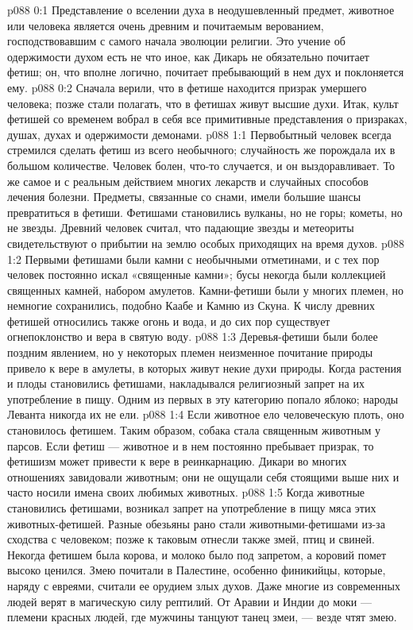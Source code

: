 \author{Блестящая Вечерняя Звезда}
\vs p088 0:1 Представление о вселении духа в неодушевленный предмет, животное или человека является очень древним и почитаемым верованием, господствовавшим с самого начала эволюции религии. Это учение об одержимости духом есть не что иное, как  Дикарь не обязательно почитает фетиш; он, что вполне логично, почитает пребывающий в нем дух и поклоняется ему.
\vs p088 0:2 Сначала верили, что в фетише находится призрак умершего человека; позже стали полагать, что в фетишах живут высшие духи. Итак, культ фетишей со временем вобрал в себя все примитивные представления о призраках, душах, духах и одержимости демонами.
\vs p088 1:1 Первобытный человек всегда стремился сделать фетиш из всего необычного; случайность же порождала их в большом количестве. Человек болен, что\hyp{}то случается, и он выздоравливает. То же самое и с реальным действием многих лекарств и случайных способов лечения болезни. Предметы, связанные со снами, имели большие шансы превратиться в фетиши. Фетишами становились вулканы, но не горы; кометы, но не звезды. Древний человек считал, что падающие звезды и метеориты свидетельствуют о прибытии на землю особых приходящих на время духов.
\vs p088 1:2 Первыми фетишами были камни с необычными отметинами, и с тех пор человек постоянно искал «священные камни»; бусы некогда были коллекцией священных камней, набором амулетов. Камни\hyp{}фетиши были у многих племен, но немногие сохранились, подобно Каабе и Камню из Скуна. К числу древних фетишей относились также огонь и вода, и до сих пор существует огнепоклонство и вера в святую воду.
\vs p088 1:3 Деревья\hyp{}фетиши были более поздним явлением, но у некоторых племен неизменное почитание природы привело к вере в амулеты, в которых живут некие духи природы. Когда растения и плоды становились фетишами, накладывался религиозный запрет на их употребление в пищу. Одним из первых в эту категорию попало яблоко; народы Леванта никогда их не ели.
\vs p088 1:4 Если животное ело человеческую плоть, оно становилось фетишем. Таким образом, собака стала священным животным у парсов. Если фетиш --- животное и в нем постоянно пребывает призрак, то фетишизм может привести к вере в реинкарнацию. Дикари во многих отношениях завидовали животным; они не ощущали себя стоящими выше них и часто носили имена своих любимых животных.
\vs p088 1:5 Когда животные становились фетишами, возникал запрет на употребление в пищу мяса этих животных\hyp{}фетишей. Разные обезьяны рано стали животными\hyp{}фетишами из\hyp{}за сходства с человеком; позже к таковым отнесли также змей, птиц и свиней. Некогда фетишем была корова, и молоко было под запретом, а коровий помет высоко ценился. Змею почитали в Палестине, особенно финикийцы, которые, наряду с евреями, считали ее орудием злых духов. Даже многие из современных людей верят в магическую силу рептилий. От Аравии и Индии до моки --- племени красных людей, где мужчины танцуют танец змеи, --- везде чтят змею.
